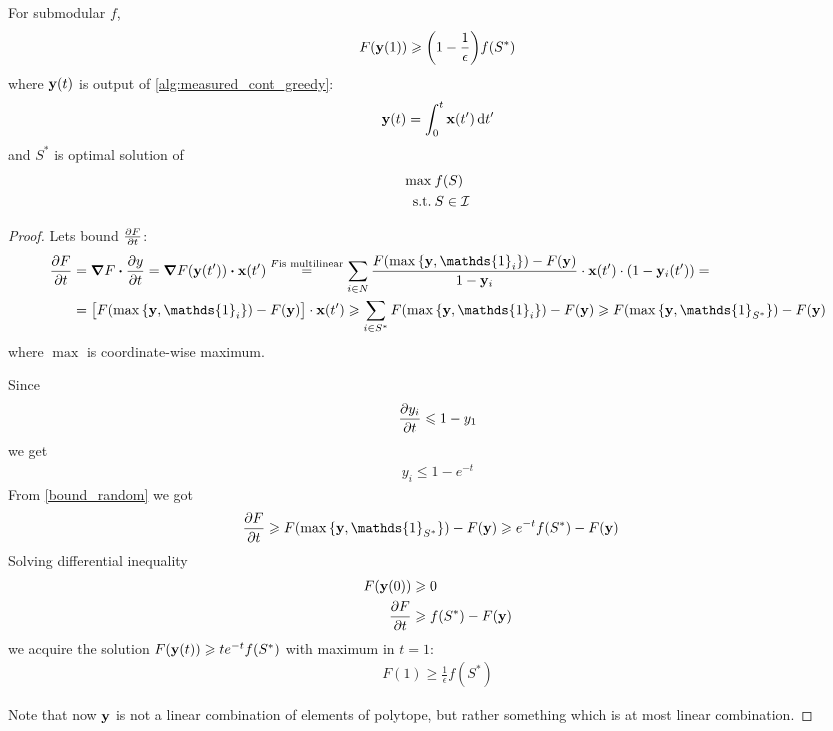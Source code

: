 \begin{theorem}
	For submodular $f$,
	\begin{align}
	F(\vb{y}(1)) \geqslant \qty(1-\frac{1}{\epsilon})f(S^*)
	\end{align}
	where $\vb{y}(t)$ is output of \vref{alg:measured_cont_greedy}:
	\begin{align}
	\vb{y}(t) = \int_0^t \vb{x}(t') \dd{t'}
	\end{align}
	and $S^*$ is optimal solution of
	\begin{align}
	\max \: & f(S)\\
	\text{s.t.} \: & S\in \mathcal{I}
	\end{align}
	\begin{proof}
		Lets bound $\pdv{F}{t} (\vb{y}(t'))$:
		\begin{align}
		\pdv{F}{t} (\vb{y}(t')) &=  \grad{F} \vdot \pdv{y}{t} =  \grad{F\qty(\vb{y}(t'))} \vdot \vb{x}(t') \stackrel{F \text{is multilinear}}{=} \sum_{i \in N} \frac{F\qty(\max\qty{\vb{y}, \mathds{1}_i})-F(\vb{y})}{1-\vb{y}_i}\cdot \vb{x}(t') \cdot   \qty(1-\vb{y}_i(t')) =\\&=
		\qty\big[F\qty(\max\qty{\vb{y}, \mathds{1}_i})-F(\vb{y})]\cdot \vb{x}(t') \geqslant \sum_{i \in S^*} F\qty(\max\qty{\vb{y}, \mathds{1}_i})-F(\vb{y}) \geqslant F\qty(\max\qty{\vb{y}, \mathds{1}_{S^*}})-F(\vb{y})
		\end{align}
		where $\max$ is coordinate-wise maximum.
		
		Since
		\begin{align}
		\pdv{y_i}{t} \leqslant 1-y_1
		\end{align}
		we get
		\begin{align}
			y_i \leqslant 1-e^{-t}
		\end{align}
		From \ref{bound_random} we got
		\begin{align}
		\pdv{F}{t} (\vb{y}(t')) &\geqslant F\qty(\max\qty{\vb{y}, \mathds{1}_{S^*}})-F(\vb{y}) \geqslant e^{-t} f(S^*) - F(\vb{y})
		\end{align}
		Solving differential inequality
		\begin{align}
		F(\vb{y}(0)) &\geqslant 0 \\
		\pdv{F}{t} &\geqslant f(S^*) - F(\vb{y})
		\end{align}
		we acquire the solution $F(\vb{y}(t)) \geqslant te^{-t} f(S^*)$ with maximum in $t=1$:
		\begin{align}
		F(1) \geqslant \frac{1}{\epsilon}f(S^*)
		\end{align}
		
		Note that now $\vb{y}$ is not a linear combination of elements of polytope, but rather something which is at most linear combination.
	\end{proof}
\end{theorem}

